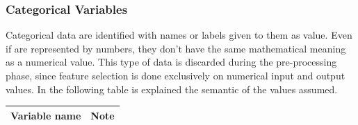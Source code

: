 \subsubsection{Categorical Variables}
Categorical data are identified with names or labels given to them as value. Even if are represented by numbers, they don't have the same mathematical meaning as a numerical value. This type of data is discarded during the pre-processing phase, since feature selection is done exclusively on numerical input and output values. 
In the following table is explained the semantic of the values assumed.
\bigbreak
\begin{center} 
\setlength{\arrayrulewidth}{1.5pt}
\begin{longtable}{ |p{2.5cm}|p{10cm}| } 
\hline
\textbf{Variable name} & \textbf{Note}\\ 
\hline


\end{longtable}
\end{center}
